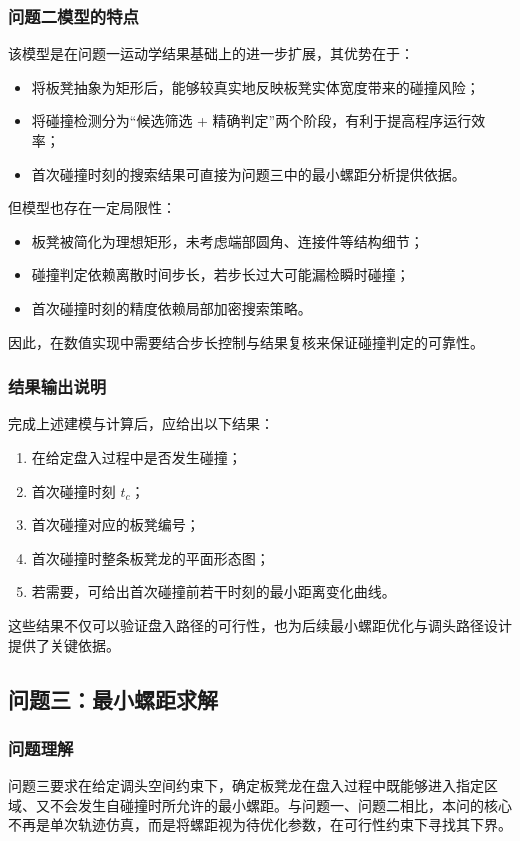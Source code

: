 \documentclass[12pt,a4paper]{ctexart}
\begin{document}
\subsubsection{问题二模型的特点}
该模型是在问题一运动学结果基础上的进一步扩展，其优势在于：
\begin{itemize}
    \item 将板凳抽象为矩形后，能够较真实地反映板凳实体宽度带来的碰撞风险；
    \item 将碰撞检测分为“候选筛选 + 精确判定”两个阶段，有利于提高程序运行效率；
    \item 首次碰撞时刻的搜索结果可直接为问题三中的最小螺距分析提供依据。
\end{itemize}

但模型也存在一定局限性：
\begin{itemize}
    \item 板凳被简化为理想矩形，未考虑端部圆角、连接件等结构细节；
    \item 碰撞判定依赖离散时间步长，若步长过大可能漏检瞬时碰撞；
    \item 首次碰撞时刻的精度依赖局部加密搜索策略。
\end{itemize}

因此，在数值实现中需要结合步长控制与结果复核来保证碰撞判定的可靠性。

\subsubsection{结果输出说明}
完成上述建模与计算后，应给出以下结果：
\begin{enumerate}
    \item 在给定盘入过程中是否发生碰撞；
    \item 首次碰撞时刻 $t_c$；
    \item 首次碰撞对应的板凳编号；
    \item 首次碰撞时整条板凳龙的平面形态图；
    \item 若需要，可给出首次碰撞前若干时刻的最小距离变化曲线。
\end{enumerate}

\noindent 这些结果不仅可以验证盘入路径的可行性，也为后续最小螺距优化与调头路径设计提供了关键依据。
\subsection{问题三：最小螺距求解}

\subsubsection{问题理解}
问题三要求在给定调头空间约束下，确定板凳龙在盘入过程中既能够进入指定区域、又不会发生自碰撞时所允许的最小螺距。与问题一、问题二相比，本问的核心不再是单次轨迹仿真，而是将螺距视为待优化参数，在可行性约束下寻找其下界。
\end{document}
